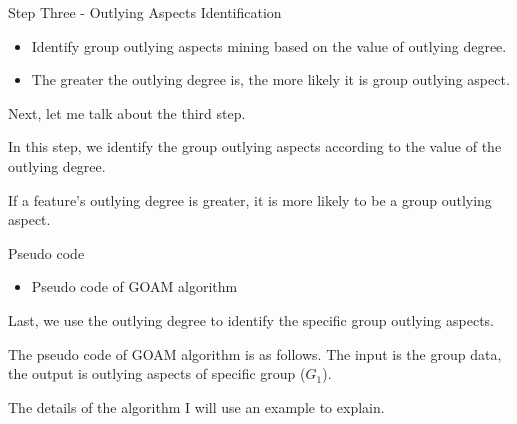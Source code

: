 \documentclass[
 size=14pt,
 paper=smartboard,  %
 mode=present, 		%
 display=slides, 	%
 style=tuliplab,  	%
 pauseslide,
 fleqn,leqno]{powerdot}
\begin{document}
\begin{slide}{Step Three - Outlying Aspects Identification}
\begin{itemize}
\item
Identify group outlying aspects mining based on the value
of outlying degree.

\item
The greater the outlying degree is,
the more likely it is group outlying aspect.
\end{itemize}

\begin{note}
Next,
let me talk about the third step.

In this step,
we identify the group outlying aspects according to the value of the outlying degree.

If a feature's outlying degree is greater,
it is more likely to be a group outlying aspect.
\end{note}

\end{slide}


\begin{slide}[toc=,bm=]{Pseudo code}

\begin{itemize}
\item
Pseudo code of GOAM algorithm

\end{itemize}

\begin{figure}
  \centering
\end{figure}

\begin{note}
Last,
we use the outlying degree to identify the specific group outlying aspects.

The pseudo code of GOAM algorithm is as follows.
The input is the group data,
the output is outlying aspects of specific group ($G_1$).

The details of the algorithm I will use an example to explain.
\end{note}

\end{slide}
\end{document}

